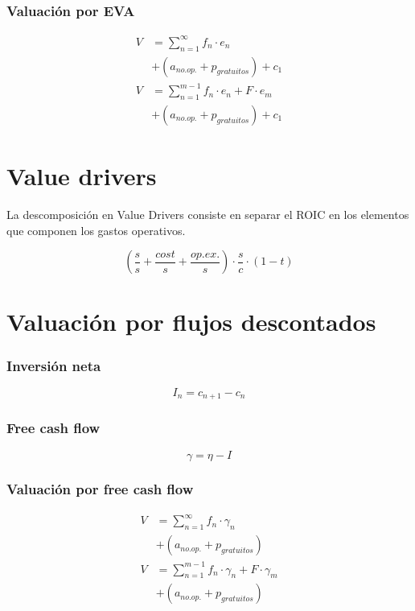 \begin{multicols}{2}
\subsubsection*{Valuación por EVA}
\begin{align*}
    V   &= \sum_{n=1}^\infty f_n \cdot e_n \\
        & + \left(a_{no.op.}+p_{gratuitos}\right) + c_1\\
    V   &= \sum_{n=1}^{m-1} f_n \cdot e_n + F \cdot e_m\\
        & + \left(a_{no.op.}+p_{gratuitos}\right) + c_1
\end{align*}


\section{Value drivers}

La descomposición en Value Drivers consiste en separar el ROIC en los elementos que componen los gastos operativos.

\begin{equation}
    \left(\frac{s}{s}+\frac{cost}{s}+\frac{op.ex.}{s}\right)\cdot \frac{s}{c}\cdot(1-t)
\end{equation}

\section{Valuación por flujos descontados}

\subsubsection*{Inversión neta}
\begin{equation}
    I_n = c_{n+1} - c_{n}
\end{equation}

\subsubsection*{Free cash flow}
\begin{equation}
    \gamma = \eta - I
\end{equation}

\subsubsection*{Valuación por free cash flow}

\begin{align*}
    V   &= \sum_{n=1}^\infty f_n \cdot \gamma_n \\
        & + \left(a_{no.op.}+p_{gratuitos}\right)\\
    V   &= \sum_{n=1}^{m-1} f_n \cdot \gamma_n + F \cdot \gamma_m\\
        & + \left(a_{no.op.}+p_{gratuitos}\right)
\end{align*}

\end{multicols}
